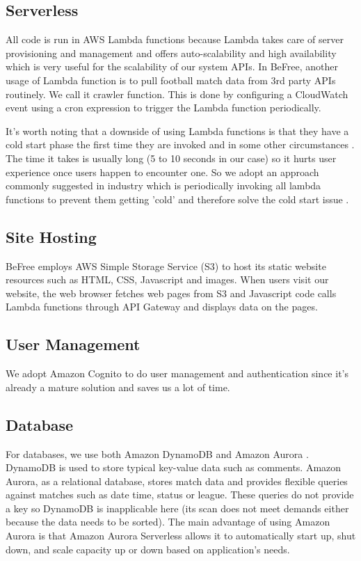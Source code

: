 \documentclass[conference]{IEEEtran}
\begin{document}
\subsection{Serverless}
All code is run in AWS Lambda \cite{lambda} functions because Lambda takes care of server provisioning and management and offers auto-scalability and high availability which is very useful for the scalability of our system APIs. In BeFree, another usage of Lambda function is to pull football match data from 3rd party APIs routinely. We call it crawler function. This is done by configuring a CloudWatch \cite{cloudwatch} event using a cron expression to trigger the Lambda function periodically.

It's worth noting that a downside of using Lambda functions is that they have a cold start phase the first time they are invoked and in some other circumstances \cite{lambda-contex}. The time it takes is usually long (5 to 10 seconds in our case) so it hurts user experience once users happen to encounter one. So we adopt an approach commonly suggested in industry which is periodically invoking all lambda functions to prevent them getting 'cold' and therefore solve the cold start issue \cite{about-cold-start} \cite{resolve-cold-start}.

\subsection{Site Hosting}
BeFree employs AWS Simple Storage Service (S3) \cite{s3} to host its static website resources such as HTML, CSS, Javascript and images. When users visit our website, the web browser fetches web pages from S3 and Javascript code calls Lambda functions through API Gateway \cite{api-gateway} and displays data on the pages.

\subsection{User Management}
We adopt Amazon Cognito \cite{cognito} to do user management and authentication since it's already a mature solution and saves us a lot of time.

\subsection{Database}
For databases, we use both Amazon DynamoDB \cite{dynamodb} and Amazon Aurora \cite{aurora}. DynamoDB is used to store typical key-value data such as comments. Amazon Aurora, as a relational database, stores match data and provides flexible queries against matches such as date time, status or league. These queries do not provide a key so DynamoDB is inapplicable here (its scan does not meet demands either because the data needs to be sorted). The main advantage of using Amazon Aurora is that Amazon Aurora Serverless \cite{aurora-serverless} allows it to automatically start up, shut down, and scale capacity up or down based on application's needs.
\end{document}
